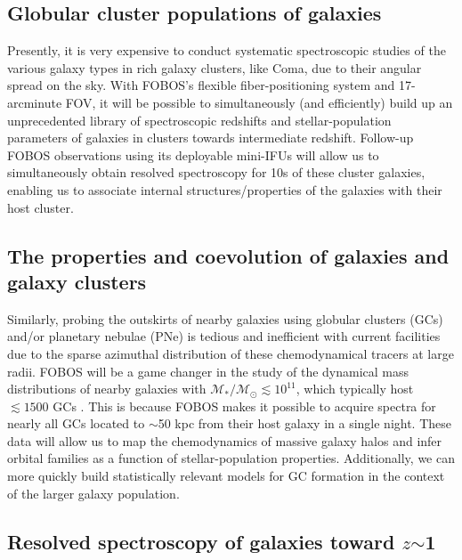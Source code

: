 
\subsection{Globular cluster populations of galaxies}

Presently, it is very expensive to conduct systematic spectroscopic
studies of the various galaxy types in rich galaxy clusters, like
Coma, due to their angular spread on the sky. With FOBOS's flexible
fiber-positioning system and 17-arcminute FOV, it will be possible to
simultaneously (and efficiently) build up an unprecedented library of
spectroscopic redshifts and stellar-population parameters of galaxies
in clusters towards intermediate redshift. Follow-up FOBOS
observations using its deployable mini-IFUs will allow us to
simultaneously obtain resolved spectroscopy for 10s of these cluster
galaxies, enabling us to associate internal structures/properties of
the galaxies with their host cluster.

\subsection{The properties and coevolution of galaxies and galaxy clusters}

Similarly, probing the outskirts of nearby galaxies using globular
clusters (GCs) and/or planetary nebulae (PNe) is tedious and
inefficient with current facilities due to the sparse azimuthal
distribution of these chemodynamical tracers at large radii. FOBOS
will be a game changer in the study of the dynamical mass
distributions of nearby galaxies with $\mathcal{M_\ast/M_\odot}
\lesssim 10^{11}$, which typically host $\lesssim1500$ GCs
\citep{2013ApJ...772...82H}. This is because FOBOS makes it possible
to acquire spectra for nearly all GCs located to $\sim$50 kpc from
their host galaxy in a single night. These data will allow us to map
the chemodynamics of massive galaxy halos and infer orbital families
as a function of stellar-population properties. Additionally, we can
more quickly build statistically relevant models for GC formation in
the context of the larger galaxy population.

\subsection{Resolved spectroscopy of galaxies toward $z$$\sim$1}

